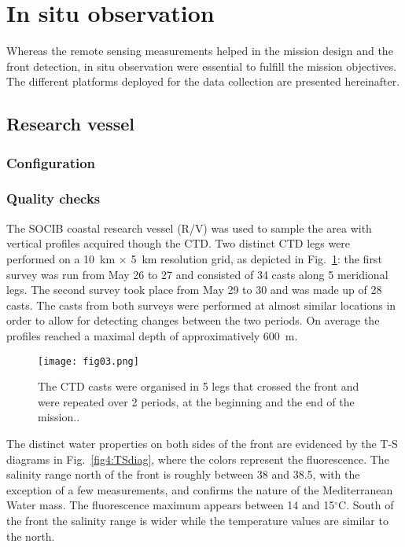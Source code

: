 \documentclass[essd,manuscript]{copernicus}
\begin{document}
\section{In situ observation}

Whereas the remote sensing measurements helped in the mission design and the front detection, in situ observation were essential to fulfill the mission objectives. The different platforms deployed for the data collection are presented hereinafter.

\subsection{Research vessel}

\subsubsection{Configuration}


\subsubsection{Quality checks}

The SOCIB coastal research vessel (R/V) was used to sample the area with vertical profiles acquired though the CTD. Two distinct CTD legs were performed on a 10~km $\times$ 5~km resolution grid, as depicted in Fig.~\ref{fig3:CTD}: the first survey was run from May 26 to 27 and consisted of 34 casts along 5 meridional legs. The second survey took place from May 29 to 30 and was made up of 28 casts. The casts from both surveys were performed at almost similar locations in order to allow for detecting changes between the two periods. On average the profiles reached a maximal depth of approximatively 600~m.

\begin{figure}[t]
\texttt{[image: fig03.png]}
\caption{The CTD casts were organised in 5 legs that crossed the front and were repeated over 2 periods, at the beginning and the end of the mission.\label{fig3:CTD}.}
\end{figure}

The distinct water properties on both sides of the front are evidenced by the T-S diagrams in Fig.~\ref{fig4:TSdiag}, where the colors represent the fluorescence. The salinity range north of the front is roughly between 38 and 38.5, with the exception of a few measurements, and confirms the nature of the Mediterranean Water mass. The fluorescence maximum appears between 14 and 15$^{\circ}$C. South of the front the salinity range is wider while the temperature values are similar to the north.
\end{document}
